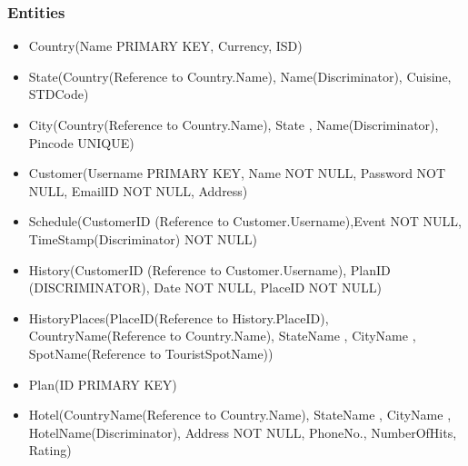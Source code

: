 \documentclass[11pt]{article}
\begin{document}
\subsubsection{Entities}

\begin{itemize}
\item Country(Name PRIMARY KEY, Currency, ISD)
\item State(Country(Reference to Country.Name), Name(Discriminator), Cuisine, STDCode)
\item City(Country(Reference to Country.Name), State , Name(Discriminator), Pincode UNIQUE)
\item Customer(Username PRIMARY KEY, Name NOT NULL, Password NOT NULL, EmailID NOT NULL, Address)
\item Schedule(CustomerID (Reference to Customer.Username),Event NOT NULL, TimeStamp(Discriminator) NOT NULL)
\item History(CustomerID (Reference to Customer.Username), PlanID (DISCRIMINATOR), Date NOT NULL, PlaceID NOT NULL)
\item HistoryPlaces(PlaceID(Reference to History.PlaceID), CountryName(Reference to Country.Name), StateName , CityName , SpotName(Reference to TouristSpotName))
\item Plan(ID PRIMARY KEY)
\item Hotel(CountryName(Reference to Country.Name), StateName , CityName , HotelName(Discriminator), Address NOT NULL, PhoneNo., NumberOfHits, Rating)
\end{itemize}
\end{document}

